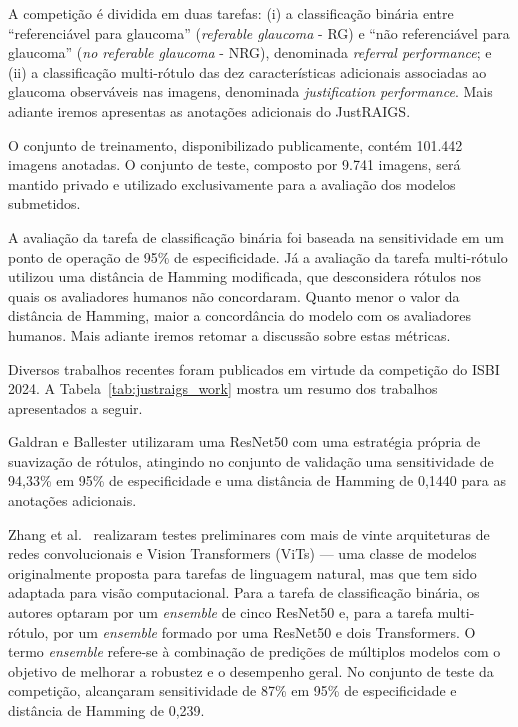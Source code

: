 \documentclass[12pt]{article}
\begin{document}
A competição é dividida em duas tarefas: (i) a classificação binária entre ``referenciável para glaucoma'' (\textit{referable glaucoma} - RG) e ``não referenciável para glaucoma'' (\textit{no referable glaucoma} -  NRG), denominada \textit{referral performance}; e (ii) a classificação multi-rótulo das dez características adicionais associadas ao glaucoma observáveis nas imagens, denominada \textit{justification performance}. Mais adiante iremos apresentas as anotações adicionais do JustRAIGS.

O conjunto de treinamento, disponibilizado publicamente, contém 101.442 imagens anotadas. O conjunto de teste, composto por 9.741 imagens, será mantido privado e utilizado exclusivamente para a avaliação dos modelos submetidos.

A avaliação da tarefa de classificação binária foi baseada na sensitividade em um ponto de operação de 95\% de especificidade. Já a avaliação da tarefa multi-rótulo utilizou uma distância de Hamming modificada, que desconsidera rótulos nos quais os avaliadores humanos não concordaram. Quanto menor o valor da distância de Hamming, maior a concordância do modelo com os avaliadores humanos. Mais adiante iremos retomar a discussão sobre estas métricas.

Diversos trabalhos recentes foram publicados em virtude da competição do ISBI 2024. A Tabela~\ref{tab:justraigs_work} mostra um resumo dos trabalhos apresentados a seguir.

Galdran e Ballester \cite{justraigs_galdran} utilizaram uma ResNet50 com uma estratégia própria de suavização de rótulos, atingindo no conjunto de validação uma sensitividade de 94,33\% em 95\% de especificidade e uma distância de Hamming de 0,1440 para as anotações adicionais.

Zhang et al.~\cite{justraigs_zhang} realizaram testes preliminares com mais de vinte arquiteturas de redes convolucionais e Vision Transformers (ViTs) --- uma classe de modelos originalmente proposta para tarefas de linguagem natural, mas que tem sido adaptada para visão computacional. Para a tarefa de classificação binária, os autores optaram por um \emph{ensemble} de cinco ResNet50 e, para a tarefa multi-rótulo, por um \emph{ensemble} formado por uma ResNet50 e dois Transformers. O termo \emph{ensemble} refere-se à combinação de predições de múltiplos modelos com o objetivo de melhorar a robustez e o desempenho geral. No conjunto de teste da competição, alcançaram sensitividade de 87\% em 95\% de especificidade e distância de Hamming de 0,239.
\end{document}
